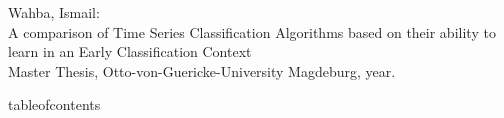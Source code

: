 \documentclass{report}
\begin{document}

\small
\vspace*{\fill}
{\raggedright
Wahba, Ismail:\\
A comparison of Time Series Classification Algorithms based on their
ability to learn in an Early Classification Context \\ Master Thesis, Otto-von-Guericke-University Magdeburg, year. 
}

\thispagestyle{empty}
\null\newpage

\null\newpage
{tableofcontents}
\null\newpage


\end{document}
